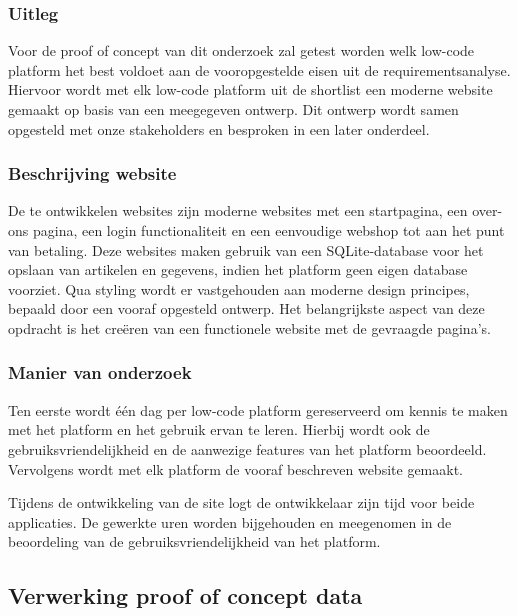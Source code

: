 \subsubsection{Uitleg}
\label{sec:Uitleg}

Voor de proof of concept van dit onderzoek zal getest worden welk low-code platform het best voldoet aan de vooropgestelde eisen uit de requirementsanalyse. Hiervoor wordt met elk low-code platform uit de shortlist een moderne website gemaakt op basis van een meegegeven ontwerp. Dit ontwerp wordt samen opgesteld met onze stakeholders en besproken in een later onderdeel.

\subsubsection{Beschrijving website}
\label{sec:Beschrijving website}

De te ontwikkelen websites zijn moderne websites met een startpagina, een over-ons pagina, een login functionaliteit en een eenvoudige webshop tot aan het punt van betaling. Deze websites maken gebruik van een SQLite-database voor het opslaan van artikelen en gegevens, indien het platform geen eigen database voorziet. Qua styling wordt er vastgehouden aan moderne design principes, bepaald door een vooraf opgesteld ontwerp. Het belangrijkste aspect van deze opdracht is het creëren van een functionele website met de gevraagde pagina’s.

\subsubsection{Manier van onderzoek}
\label{sec:Manier van onderzoek}

Ten eerste wordt één dag per low-code platform gereserveerd om kennis te maken met het platform en het gebruik ervan te leren. Hierbij wordt ook de gebruiksvriendelijkheid en de aanwezige features van het platform beoordeeld. Vervolgens wordt met elk platform de vooraf beschreven website gemaakt.

\vspace{\baselineskip}

Tijdens de ontwikkeling van de site logt de ontwikkelaar zijn tijd voor beide applicaties. De gewerkte uren worden bijgehouden en meegenomen in de beoordeling van de gebruiksvriendelijkheid van het platform.

\subsection{Verwerking proof of concept data}
\label{sec:Verwerking proof of concept data}

